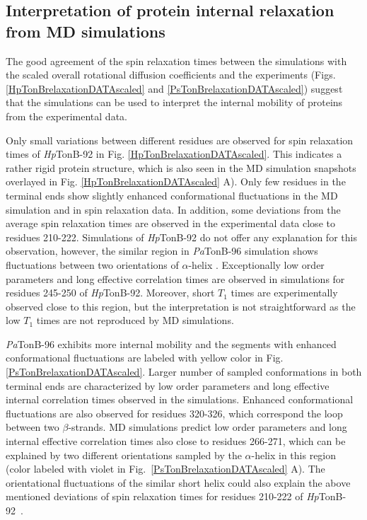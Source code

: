 \documentclass[journal=jpcbfk,manuscript=article]{achemso}
\providecommand{\DIFadd}[1]{{\protect\color{blue}\uwave{#1}}} %
\providecommand{\DIFaddbegin}{} %
\providecommand{\DIFaddend}{} %
\begin{document}
\subsection{Interpretation of protein internal relaxation from MD simulations}
The good agreement of the spin relaxation times between the simulations
with the scaled overall rotational diffusion coefficients and
the experiments (Figs. \ref{HpTonBrelaxationDATAscaled} and \ref{PsTonBrelaxationDATAscaled})
suggest that the simulations can be used to interpret the internal
mobility of proteins from the experimental data.

Only small variations between different residues are observed
for spin relaxation times of {\it Hp}TonB-92 in Fig. \ref{HpTonBrelaxationDATAscaled}.
This indicates a rather rigid protein structure, which is also seen in
the MD simulation snapshots overlayed in Fig. \ref{HpTonBrelaxationDATAscaled} A).
Only few residues in the terminal ends show slightly
enhanced conformational fluctuations in the MD simulation and in
spin relaxation data. In addition, some deviations from the average spin relaxation times
are observed in the experimental data close to residues 210-222.
Simulations of {\it Hp}TonB-92 do not offer any explanation for this
observation, however, the similar region in {\it Pa}TonB-96 simulation shows 
fluctuations between two orientations of $\alpha$-helix \cite{oeemig17}.
Exceptionally low order parameters and long effective correlation times 
are observed in simulations for residues 245-250 of {\it Hp}TonB-92.
Moreover, short $T_1$ times are experimentally observed close to this region,
but the interpretation is not straightforward as the low $T_1$ times
are not reproduced by MD simulations.

{\it Pa}TonB-96 exhibits more internal mobility 
and the segments with enhanced conformational fluctuations are labeled with yellow color
in Fig. \ref{PsTonBrelaxationDATAscaled}.
Larger number of sampled conformations in both terminal ends
are characterized by \DIFaddbegin \DIFadd{the }\DIFaddend low order parameters and long effective internal correlation times
observed in the simulations. 
Enhanced conformational fluctuations are also observed for residues 320-326,
which correspond the loop between two $\beta$-strands.
MD simulations predict low order parameters and long internal effective correlation
times also close to residues 266-271, which can be explained by  
two different orientations sampled by the $\alpha$-helix in this region
(color labeled with violet in Fig.~\ref{PsTonBrelaxationDATAscaled} A).
The orientational fluctuations of the similar short helix could also explain the above mentioned
deviations of spin relaxation times for residues 210-222 of {\it Hp}TonB-92~\cite{ciragan16}.
\end{document}
